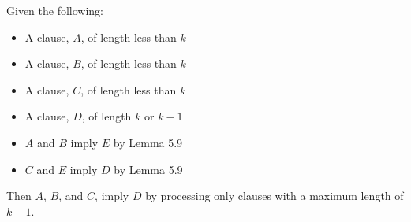 \documentclass[manuscript]{acmart}
\begin{document}
    \begin{lemma}
        Given the following:
        \begin{itemize}
            \item A clause, $A$, of length less than $k$
            \item A clause, $B$, of length less than $k$
            \item A clause, $C$, of length less than $k$
            \item A clause, $D$, of length $k$ or $k - 1$
            \item $A$ and $B$ imply $E$ by Lemma 5.9
            \item $C$ and $E$ imply $D$ by Lemma 5.9
        \end{itemize}
        Then $A$, $B$, and $C$, imply $D$ by processing only clauses with a maximum length of $k - 1$.
    \end{lemma}
\end{document}
